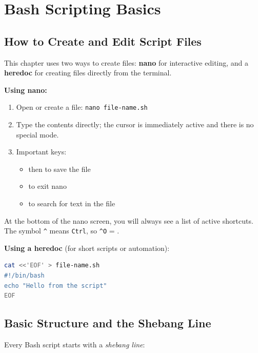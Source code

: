 \section{Bash Scripting Basics}
\label{sec:creating-scripts}

\subsection*{How to Create and Edit Script Files}

This chapter uses two ways to create files: \textbf{nano} for interactive
editing, and a \textbf{heredoc} for creating files directly from the
terminal.

\textbf{Using nano:}
\begin{enumerate}
  \item Open or create a file: \texttt{nano file-name.sh}
  \item Type the contents directly; the cursor is immediately active and
    there is no special mode.
  \item Important keys:
  \begin{itemize}
    \item {} then  to save the file
    \item {} to exit nano
    \item {} to search for text in the file
  \end{itemize}
\end{enumerate}

\begin{notebox}
At the bottom of the nano screen, you will always see a list of active
shortcuts. The symbol \texttt{\^{}} means \texttt{Ctrl}, so
\texttt{\^{}O} = .
\end{notebox}

\textbf{Using a heredoc} (for short scripts or automation):
\begin{lstlisting}[language=bash, caption={Creating a file with a heredoc}]
cat <<'EOF' > file-name.sh
#!/bin/bash
echo "Hello from the script"
EOF
\end{lstlisting}

\subsection*{Basic Structure and the Shebang Line}

Every Bash script starts with a \textit{shebang line}:

